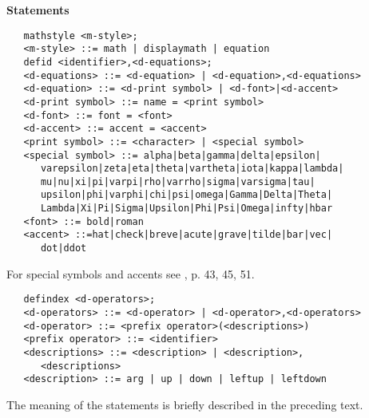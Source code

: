 \textbf{Statements}

\begin{verbatim}
   mathstyle <m-style>;
   <m-style> ::= math | displaymath | equation
   defid <identifier>,<d-equations>;
   <d-equations> ::= <d-equation> | <d-equation>,<d-equations>
   <d-equation> ::= <d-print symbol> | <d-font>|<d-accent>
   <d-print symbol> ::= name = <print symbol>
   <d-font> ::= font = <font>
   <d-accent> ::= accent = <accent>
   <print symbol> ::= <character> | <special symbol>
   <special symbol> ::= alpha|beta|gamma|delta|epsilon|
      varepsilon|zeta|eta|theta|vartheta|iota|kappa|lambda|
      mu|nu|xi|pi|varpi|rho|varrho|sigma|varsigma|tau|
      upsilon|phi|varphi|chi|psi|omega|Gamma|Delta|Theta|
      Lambda|Xi|Pi|Sigma|Upsilon|Phi|Psi|Omega|infty|hbar
   <font> ::= bold|roman
   <accent> ::=hat|check|breve|acute|grave|tilde|bar|vec|
      dot|ddot
\end{verbatim}

For special symbols and accents see \cite{Lamport:86}, p. 43, 45, 51.

\begin{verbatim}
   defindex <d-operators>;
   <d-operators> ::= <d-operator> | <d-operator>,<d-operators>
   <d-operator> ::= <prefix operator>(<descriptions>)
   <prefix operator> ::= <identifier>
   <descriptions> ::= <description> | <description>,
      <descriptions>
   <description> ::= arg | up | down | leftup | leftdown
\end{verbatim}

The meaning of the statements is briefly described in the preceding
text.
